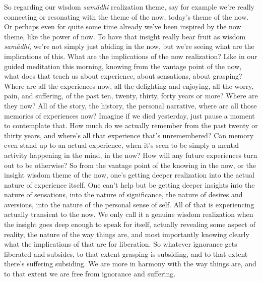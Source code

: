 \documentclass[12pt,openany]{book}
\begin{document}
So regarding our wisdom \textit{samādhi} realization theme, say for example we’re really connecting or resonating with the theme of the now, today’s theme of the now. Or perhaps even for quite some time already we've been inspired by the now theme, like the power of now. To have that insight really bear fruit as wisdom \textit{samādhi}, we're not simply just abiding in the now, but we’re seeing what are the implications of this. What are the implications of the now realization? Like in our guided meditation this morning, knowing from the vantage point of the now, what does that teach us about experience, about sensations, about grasping? Where are all the experiences now, all the delighting and enjoying, all the worry, pain, and suffering, of the past ten, twenty, thirty, forty years or more? Where are they now? All of the story, the history, the personal narrative, where are all those memories of experiences now? Imagine if we died yesterday, just \linebreak pause a moment to contemplate that. How much do we actually remember from the past twenty or thirty years, and where's all that experience that's unremembered? Can memory even stand up to an actual experience, when it’s seen to be simply a mental activity happening in the mind, in the now? How will any future experiences turn out to be otherwise? So from the vantage point of the knowing in the now, or the insight wisdom theme of the now, one’s getting deeper realization into the actual nature of experience itself. One can't help but be getting deeper insights into the nature of sensations, into the nature of significance, the nature of desires and aversions, into the nature of the personal sense of self. All of that is experiencing actually transient to the now. We only call it a genuine wisdom realization when the insight goes deep enough to speak for itself, actually revealing some aspect of reality, the nature of the way things are, and most importantly knowing clearly what the implications of that are for liberation. So whatever ignorance gets liberated and subsides, to that extent grasping is subsiding, and to that extent there’s suffering subsiding. We are more in harmony with the way things are, and to that extent we are free from ignorance and suffering. 
\end{document}
